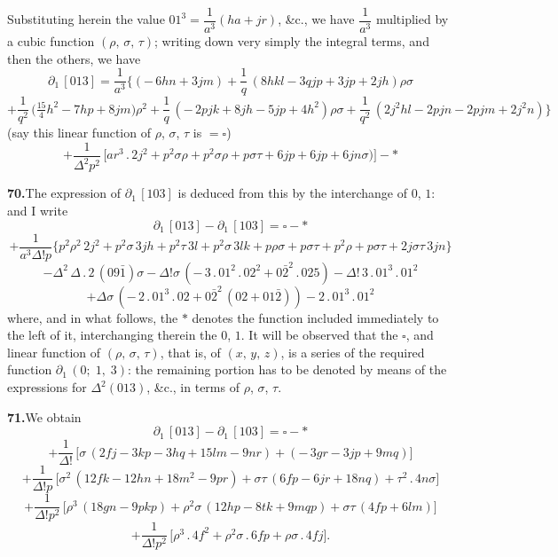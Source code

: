 \documentclass[11pt,a4paper]{article}
\theoremstyle{plain}
\theoremstyle{definition}
\theoremstyle{remark}
\begin{document}
Substituting herein the value $01^{3} = \dfrac{1}{a^{3}}(ha + jr)$, \&c., we have $\dfrac{1}{a^{3}}$ multiplied by a cubic function $(\rho,\,\sigma,\,\tau)$; writing down very simply the integral terms, and then the others, we have
\[
\partial_1\,[013] = \frac{1}{a^{3}}\bigl\{(-\,6hn + 3jm) + \frac{1}{q}\,(8hkl - 3qjp + 3jp + 2jh)\rho\sigma
\]
\[
+ \frac{1}{q^{2}}\,\bigl(\tfrac{15}{4}h^{2} - 7hp + 8jm\bigr)\rho^{2} + \frac{1}{q}\,(-\,2pjk + 8jh - 5jp + 4h^{2})\rho\sigma + \frac{1}{q^{2}}\,(2j^{2}hl - 2pj n - 2pjm + 2j^{2}n)\bigr\}
\]
(say this linear function of $\rho$, $\sigma$, $\tau$ is $= \square$)
\[
+ \frac{1}{\Delta^{2}p^{2}}\,\bigl[ar^{3}\,.\,2j^{2} + p^{2}\sigma\rho + p^{2}\sigma\rho + p\sigma\tau + 6jp + 6jp + 6jn\sigma)\bigr] - *
\]

\medskip\noindent\textbf{70.}\quad The expression of $\partial_1\,[103]$ is deduced from this by the interchange of $0$, $1$: and I write
\[
\partial_1\,[013] - \partial_1\,[103] = \square - *
\]
\[
+ \frac{1}{a^{3}\Delta!p}\bigl\{p^{2}\rho^{2}\,2j^{2} + p^{2}\sigma\,3jh + p^{2}\tau\,3l + p^{2}\sigma\,3lk + p\rho\sigma + p\sigma\tau + p^{2}\rho + p\sigma\tau + 2j\sigma\tau\,3jn\bigr\}
\]
\[
- \Delta^{2}\,\Delta\,.\,2\,(09\bar{1})\sigma - \Delta!\sigma\,(-\,3\,.\,01^{2}\,.\,02^{2} + 0\bar{2}^{2}\,.\,025) - \Delta!\,3\,.\,01^{3}\,.\,01^{2}
\]
\[
+ \Delta\sigma\,(-\,2\,.\,01^{3}\,.\,02 + 0\bar{2}^{2}\,(02 + 01\bar{2})) - 2\,.\,01^{3}\,.\,01^{2}
\]
where, and in what follows, the $*$ denotes the function included immediately to the left of it, interchanging therein the $0$, $1$. It will be observed that the $\square$, and linear function of $(\rho,\,\sigma,\,\tau)$, that is, of $(x,\,y,\,z)$, is a series of the required function $\partial_1\,(0;\;1,\;3)$: the remaining portion has to be denoted by means of the expressions for $\Delta^{2}(013)$, \&c., in terms of $\rho$, $\sigma$, $\tau$.

\medskip\noindent\textbf{71.}\quad We obtain
\[
\partial_1\,[013] - \partial_1\,[103] = \square - *
\]
\[
+ \frac{1}{\Delta!}\,\bigl[\sigma\,(2fj - 3kp - 3hq + 15lm - 9nr) + (-\,3gr - 3jp + 9mq)\bigr]
\]
\[
+ \frac{1}{\Delta!p}\,\bigl[\sigma^{2}\,(12fk - 12hn + 18m^{2} - 9pr) + \sigma\tau\,(6fp - 6jr + 18nq) + \tau^{2}\,.\,4n\sigma\bigr]
\]
\[
+ \frac{1}{\Delta!p^{2}}\,\bigl[\rho^{3}\,(18gn - 9pkp) + \rho^{2}\sigma\,(12hp - 8tk + 9mqp) + \sigma\tau\,(4fp + 6lm)\bigr]
\]
\[
+ \frac{1}{\Delta!p^{2}}\,\bigl[\rho^{3}\,.\,4f^{2} + \rho^{2}\sigma\,.\,6fp + \rho\sigma\,.\,4f j\bigr].
\]
\end{document}
